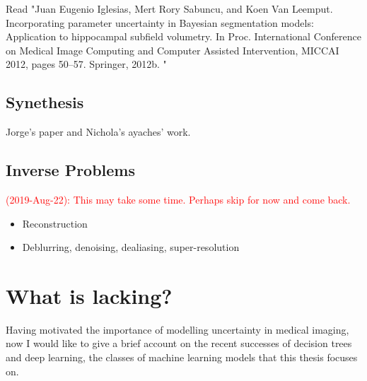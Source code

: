 Read "Juan Eugenio Iglesias, Mert Rory Sabuncu, and Koen Van Leemput. Incorporating parameter uncertainty in Bayesian segmentation models: Application to hippocampal subfield volumetry. In Proc. International Conference on Medical Image Computing and Computer Assisted Intervention, MICCAI 2012, pages 50–57. Springer, 2012b. "

\subsection{Synethesis}
Jorge's paper and Nichola's ayaches' work. 

\subsection{Inverse Problems}
\textcolor{red}{(2019-Aug-22): This may take some time. Perhaps skip for now and come back.}
\begin{itemize}
	\item Reconstruction
	\item Deblurring, denoising, dealiasing, super-resolution 
\end{itemize}


\section{What is lacking?}
Having motivated the importance of modelling uncertainty in medical imaging, now I would like to give a brief account on the recent successes of decision trees and deep learning, the classes of machine learning models that this thesis focuses on. 

